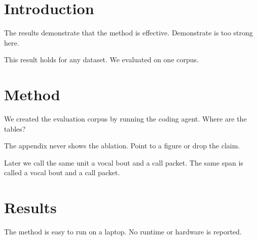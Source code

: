 \documentclass{article}
\newcommand{\myremark}[1]{#1}
\begin{document}
\section{Introduction}

The results demonstrate that the method is effective.
\myremark{Demonstrate is too strong here.}

This result holds for any dataset.
\myremark{We evaluated on one corpus.}

\section{Method}

We created the evaluation corpus by running the coding agent.
\myremark{Where are the tables?}

The appendix never shows the ablation.
\myremark{Point to a figure or drop the claim.}

Later we call the same unit a vocal bout and a call packet.
\myremark{The same span is called a vocal bout and a call packet.}

\section{Results}

The method is easy to run on a laptop.
\myremark{No runtime or hardware is reported.}
\end{document}
